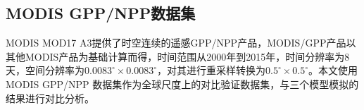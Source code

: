 \subsection{MODIS GPP/NPP数据集}
MODIS MOD17 A3提供了时空连续的遥感GPP/NPP产品，MODIS/GPP产品以其他MODIS产品为基础计算而得，时间范围从2000年到2015年，时间分辨率为8天，空间分辨率为$0.0083^{\circ} \times 0.0083^{\circ}$，对其进行重采样转换为$0.5^{\circ} \times 0.5^{\circ}$。本文使用MODIS GPP/NPP 数据集作为全球尺度上的对比验证数据集，与三个模型模拟的结果进行对比分析。






